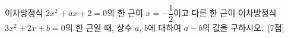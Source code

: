 이차방정식 $2x^2+ax+2=0$의 한 근이 $x=-\dfrac{1}{2}$이고 다른 한 근이 이차방정식 $3x^2+2x+b=0$의 한 근일 때, 상수 $a$, $b$에 대하여 $a-b$의 값을 구하시오.~\mbox{\mbox{[7점]}}
